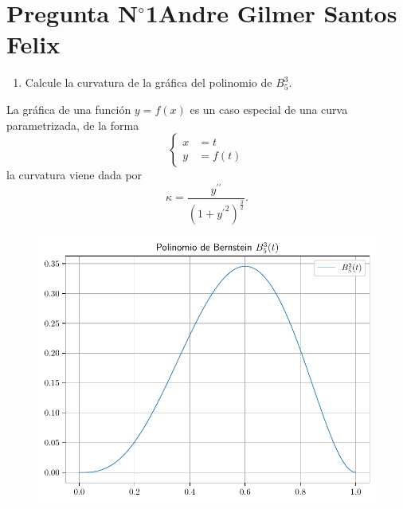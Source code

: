 \section{Pregunta N$^{\circ}$1\qquad Andre Gilmer Santos Felix}

\begin{frame}
    \begin{enumerate}\setcounter{enumi}{0}
        \item

              Calcule la curvatura de la gráfica del polinomio de
              $B^{3}_{5}$.
    \end{enumerate}

    \begin{solution}
        La gráfica de una función $y=f\left(x\right)$ es un caso
        especial de una curva parametrizada, de la forma
        \begin{equation*}
            \begin{cases}
                x & =t               \\
                y & =f\left(t\right)
            \end{cases}
        \end{equation*}
        la curvatura viene dada por
        \begin{equation*}
            \kappa=
            \dfrac{
                y^{\prime\prime}
            }{
                {\left(1+{y^{\prime}}^{2}\right)}^{\frac{3}{2}}
            }.
        \end{equation*}

        \begin{figure}[ht!]
            \centering
            \includegraphics[width=.4\paperwidth]{p1}
        \end{figure}
    \end{solution}
\end{frame}

